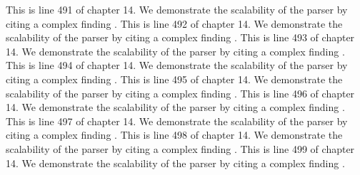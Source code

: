 This is line 491 of chapter 14. We demonstrate the scalability of the parser by citing a complex finding \cite{ref14_491}.
This is line 492 of chapter 14. We demonstrate the scalability of the parser by citing a complex finding \cite{ref14_492}.
This is line 493 of chapter 14. We demonstrate the scalability of the parser by citing a complex finding \cite{ref14_493}.
This is line 494 of chapter 14. We demonstrate the scalability of the parser by citing a complex finding \cite{ref14_494}.
This is line 495 of chapter 14. We demonstrate the scalability of the parser by citing a complex finding \cite{ref14_495}.
This is line 496 of chapter 14. We demonstrate the scalability of the parser by citing a complex finding \cite{ref14_496}.
This is line 497 of chapter 14. We demonstrate the scalability of the parser by citing a complex finding \cite{ref14_497}.
This is line 498 of chapter 14. We demonstrate the scalability of the parser by citing a complex finding \cite{ref14_498}.
This is line 499 of chapter 14. We demonstrate the scalability of the parser by citing a complex finding \cite{ref14_499}.
